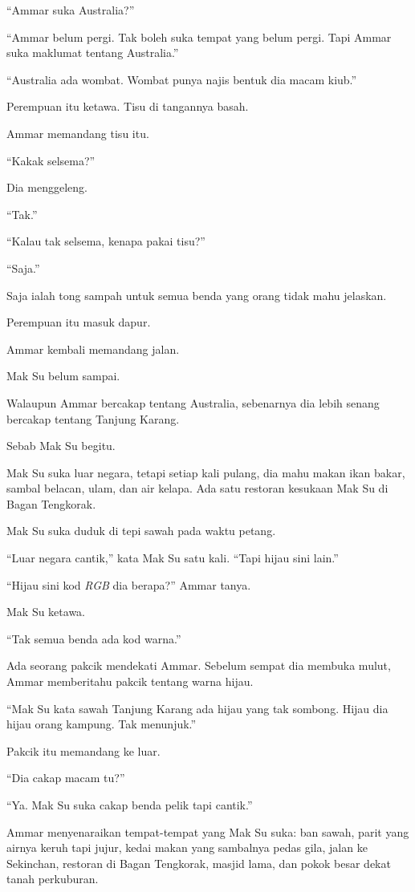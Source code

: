 \documentclass[
  11pt,
  a5paper,
  openany,
  oneside]{book}
\begin{document}
``Ammar suka Australia?''

``Ammar belum pergi. Tak boleh suka tempat yang belum pergi. Tapi Ammar
suka maklumat tentang Australia.''

``Australia ada wombat. Wombat punya najis bentuk dia macam kiub.''

Perempuan itu ketawa. Tisu di tangannya basah.

Ammar memandang tisu itu.

``Kakak selsema?''

Dia menggeleng.

``Tak.''

``Kalau tak selsema, kenapa pakai tisu?''

``Saja.''

Saja ialah tong sampah untuk semua benda yang orang tidak mahu jelaskan.

Perempuan itu masuk dapur.

Ammar kembali memandang jalan.

Mak Su belum sampai.

Walaupun Ammar bercakap tentang Australia, sebenarnya dia lebih senang
bercakap tentang Tanjung Karang.

Sebab Mak Su begitu.

Mak Su suka luar negara, tetapi setiap kali pulang, dia mahu makan ikan
bakar, sambal belacan, ulam, dan air kelapa. Ada satu restoran kesukaan
Mak Su di Bagan Tengkorak.

Mak Su suka duduk di tepi sawah pada waktu petang.

``Luar negara cantik,'' kata Mak Su satu kali. ``Tapi hijau sini lain.''

``Hijau sini kod \emph{RGB} dia berapa?'' Ammar tanya.

Mak Su ketawa.

``Tak semua benda ada kod warna.''

Ada seorang pakcik mendekati Ammar. Sebelum sempat dia membuka mulut,
Ammar memberitahu pakcik tentang warna hijau.

``Mak Su kata sawah Tanjung Karang ada hijau yang tak sombong. Hijau dia
hijau orang kampung. Tak menunjuk.''

Pakcik itu memandang ke luar.

``Dia cakap macam tu?''

``Ya. Mak Su suka cakap benda pelik tapi cantik.''

Ammar menyenaraikan tempat-tempat yang Mak Su suka: ban sawah, parit
yang airnya keruh tapi jujur, kedai makan yang sambalnya pedas gila,
jalan ke Sekinchan, restoran di Bagan Tengkorak, masjid lama, dan pokok
besar dekat tanah perkuburan.
\end{document}
